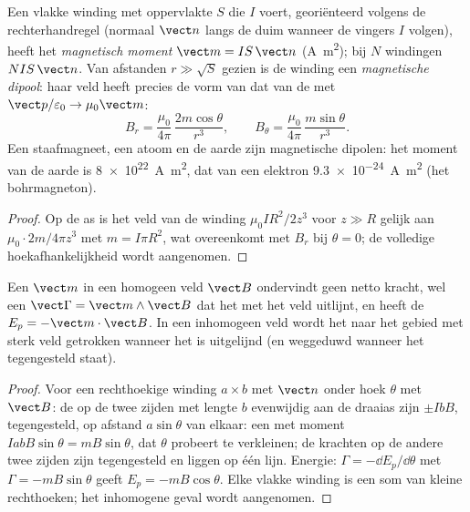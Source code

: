 \begin{definition}\label{def:b1:magnetostatics:moment}
Een vlakke winding met oppervlakte $S$ die $I$ voert, georiënteerd volgens de rechterhandregel
(normaal $\vect n$ langs de duim wanneer de vingers $I$ volgen), heeft het
\emph{magnetisch moment} $\vect m = IS\,\vect n$ (\unit{A.m^2}); bij $N$
windingen $NIS\,\vect n$. Van afstanden $r \gg \sqrt S$ gezien is de winding een
\emph{magnetische dipool}: haar veld heeft precies de vorm van dat van de  met $\vect p/\varepsilon_0 \to \mu_0\vect m$:
\[
B_r = \frac{\mu_0}{4\pi}\,\frac{2m\cos\theta}{r^3}, \qquad
B_\theta = \frac{\mu_0}{4\pi}\,\frac{m\sin\theta}{r^3} .
\]
Een staafmagneet, een atoom en de aarde zijn magnetische dipolen: het moment
van de aarde is \qty{8e22}{A.m^2}, dat van een elektron \qty{9.3e-24}{A.m^2} (het
bohrmagneton).
\end{definition}

\begin{proof}
Op de as is het veld van de winding $\mu_0IR^2/2z^3$ voor $z \gg R$ gelijk aan
$\mu_0 \cdot 2m/4\pi z^3$ met $m = I\pi R^2$, wat overeenkomt met $B_r$ bij $\theta = 0$;
de volledige hoekafhankelijkheid wordt aangenomen.
\end{proof}

\begin{theorem}\label{thm:b1:magnetostatics:dipoleinfield}
Een  $\vect m$ in een homogeen veld $\vect B$ ondervindt geen netto
kracht, wel een  $\vect\Gamma = \vect m\wedge\vect B$ dat het met
het veld uitlijnt, en heeft de  $E_p = -\vect m\cdot\vect B$. In een
inhomogeen veld wordt het naar het gebied met sterk veld getrokken wanneer het
is uitgelijnd (en weggeduwd wanneer het tegengesteld staat).
\end{theorem}

\begin{proof}
Voor een rechthoekige winding $a \times b$ met $\vect n$ onder hoek $\theta$ met
$\vect B$: de  op de twee zijden met lengte $b$ evenwijdig aan
de draaias zijn $\pm IbB$, tegengesteld, op afstand $a\sin\theta$
van elkaar: een  met moment $IabB\sin\theta = mB\sin\theta$, dat
$\theta$ probeert te verkleinen; de krachten op de andere twee zijden zijn tegengesteld en
liggen op één lijn. Energie: $\Gamma = -\dd E_p/\dd\theta$ met $\Gamma = -mB\sin\theta$
geeft $E_p = -mB\cos\theta$. Elke vlakke winding is een som van kleine rechthoeken;
het inhomogene geval wordt aangenomen.
\end{proof}

